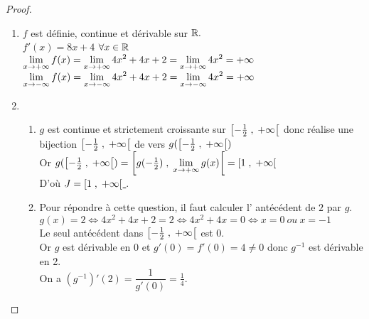 \begin{proof}
\begin{enumerate}
\item $ f $ est définie, continue et dérivable sur $ \mathbb{R}. $\\
$ f'(x) = 8x+4$  $\forall x\in \mathbb{R} $\\
$\displaystyle \lim_{x \to +\infty}f(x)= \displaystyle\lim_{x \to +\infty}4x^{2}+4x+2=\displaystyle\lim_{x \to +\infty}4x^{2}=+\infty$\\
$\displaystyle \lim_{x \to -\infty}f(x)=\displaystyle \lim_{x \to -\infty}4x^{2}+4x+2=\displaystyle\lim_{x \to -\infty}4x^{2}=+\infty$


\item 
\begin{enumerate}
\item $ g $ est continue et strictement croissante  sur  $ \left[-\frac{1}{2} \;,\; +\infty\right[ $ donc réalise une bijection $ \left[-\frac{1}{2} \;,\; +\infty\right[ $ de vers  $g( \left[-\frac{1}{2} \;,\; +\infty\right[)$ \\Or  $g( \left[-\frac{1}{2} \;,\; +\infty\right[)=\left[g(-\frac{1}{2}) \;,\; \displaystyle\lim_{x \to +\infty}g(x)\right[=\left[1 \;,\; +\infty\right[ $ \\ D'où \underline{$J= \left[1 \;,\; +\infty\right[ $ }.
\item Pour répondre à cette question, il  faut calculer  l' antécédent de $ 2 $ par $ g. $\\ $ g(x)=2\Leftrightarrow 4x^{2}+4x+2=2\Leftrightarrow 4x^{2}+4x=0\Leftrightarrow x= 0 \ ou\  x= -1$\\ Le seul antécédent dans $ \left[-\frac{1}{2} \;,\; +\infty\right[ $ est  0.\\
Or $ g $ est dérivable en 0 et $ g'(0)=f'(0)=4 \neq 0 $ donc  $ g^{-1} $  est dérivable en 2.\\
On a $(g^{-1})'(2)=\dfrac{1}{g'(0)}=\frac{1}{4}.  $
\end{enumerate}

\end{enumerate}
\end{proof}




